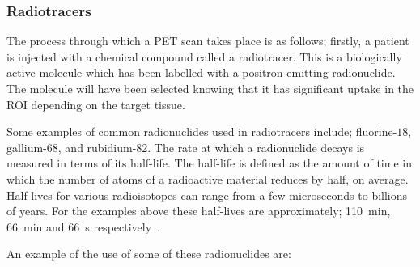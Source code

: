             \subsubsection{Radiotracers} \label{sec:radiotracers}
                The process through which a \gls{PET} scan takes place is as follows; firstly, a patient is injected with a chemical compound called a radiotracer. This is a biologically active molecule which has been labelled with a positron emitting radionuclide. The molecule will have been selected knowing that it has significant uptake in the \gls{ROI} depending on the target tissue. %
                
                Some examples of common radionuclides used in radiotracers include; fluorine-$18$, gallium-$68$, and rubidium-$82$. %
                The rate at which a radionuclide decays is measured in terms of its half-life. The half-life is defined as the amount of time in which the number of atoms of a radioactive material reduces by half, on average. Half-lives for various radioisotopes can range from a few microseconds to billions of years. For the examples above these half-lives are approximately; \SI{110}{\minute}, \SI{66}{\minute} and \SI{66}{\second} respectively~\parencite{FDGGuidelines}. %
                
                An example of the use of some of these radionuclides are:
                
